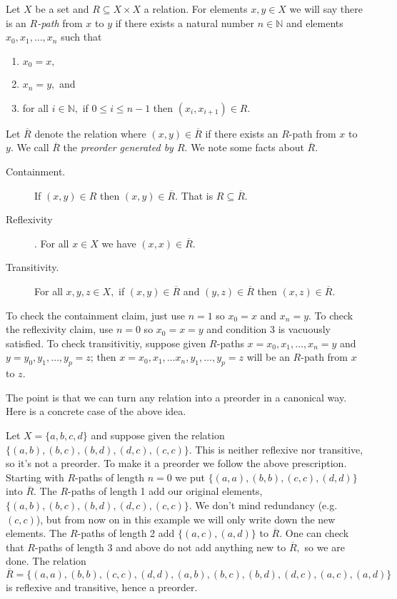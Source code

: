 \documentclass[../main/CT4S-EN-RU]{subfiles}
\begin{document}
\begin{exampleENG}\label{ex:preorder generated}
Let $X$ be a set and $R\subseteq X\times X$ a relation. For elements $x,y\in X$ we will say there is an {\em $R$-path} from $x$ to $y$ if there exists a natural number $n\in{ℕ}$ and elements $x_0,x_1,\ldots,x_n$ such that
\begin{enumerate}
\item $x_0=x,$
\item $x_n=y,$ and
\item for all $i\in{ℕ},$ if $0\leq i\leq n-1$ then $(x_i,x_{i+1})\in R.$
\end{enumerate}
Let $\overline{R}$ denote the relation where $(x,y)\in\overline{R}$ if there exists an $R$-path from $x$ to $y.$ We call $\overline{R}$ the {\em preorder generated by $R.$} We note some facts about $\overline{R}.$
\begin{description}
\item[Containment.] If $(x,y)\in R$ then $(x,y)\in\overline{R}.$ That is $R\subseteq\overline{R}.$
\item[Reflexivity]. For all $x\in X$ we have $(x,x)\in\overline{R}.$ 
\item[Transitivity.] For all $x,y,z\in X,$ if $(x,y)\in\overline{R}$ and $(y,z)\in\overline{R}$ then $(x,z)\in\overline{R}.$
\end{description}
To check the containment claim, just use $n=1$ so $x_0=x$ and $x_n=y.$ To check the reflexivity claim, use $n=0$ so $x_0=x=y$ and condition 3 is vacuously satisfied. To check transitivitiy, suppose given $R$-paths $x=x_0,x_1,\ldots,x_n=y$ and $y=y_0,y_1,\ldots,y_p=z$; then $x=x_0,x_1,\ldots x_n,y_1,\ldots,y_p=z$ will be an $R$-path from $x$ to $z.$

The point is that we can turn any relation into a preorder in a canonical way. Here is a concrete case of the above idea.

Let $X=\{a,b,c,d\}$ and suppose given the relation $\{(a,b),(b,c),(b,d),(d,c),(c,c)\}.$ This is neither reflexive nor transitive, so it's not a preorder. To make it a preorder we follow the above prescription. Starting with $R$-paths of length $n=0$ we put  $\{(a,a), (b,b), (c,c), (d,d)\}$ into $\overline{R}.$ The $R$-paths of length 1 add our original elements, $\{(a,b),(b,c),(b,d),(d,c),(c,c)\}.$ We don't mind redundancy (e.g. $(c,c)$), but from now on in this example we will only write down the new elements. The $R$-paths of length 2 add $\{(a,c),(a,d)\}$ to $\overline{R}.$ One can check that $R$-paths of length 3 and above do not add anything new to $\overline{R},$ so we are done. The relation $$\overline{R}=\{(a,a), (b,b), (c,c), (d,d), (a,b), (b,c), (b,d), (d,c), (a,c), (a,d)\}$$ is reflexive and transitive, hence a preorder.
\end{exampleENG}
\end{document}
